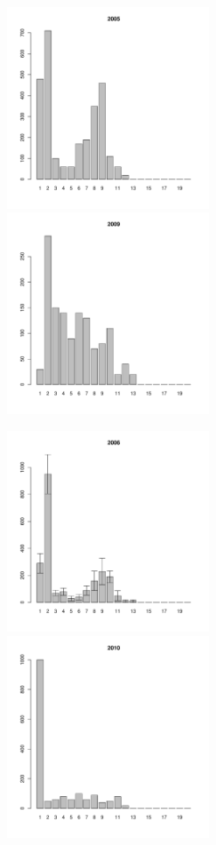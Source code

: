 \begin{figure}[h]
\begin{multicols}{3}
\hfill
\includegraphics[width=60mm]{../White_Sea/Luvenga_Goreliy/middle_2005_.pdf}
\hfill
\includegraphics[width=60mm]{../White_Sea/Luvenga_Goreliy/middle_2009_.pdf}
\end{multicols}


\begin{multicols}{3}
\hfill
\includegraphics[width=60mm]{../White_Sea/Luvenga_Goreliy/middle_2006_.pdf}
\hfill
\includegraphics[width=60mm]{../White_Sea/Luvenga_Goreliy/middle_2010_.pdf}
\end{multicols}


\end{figure}
